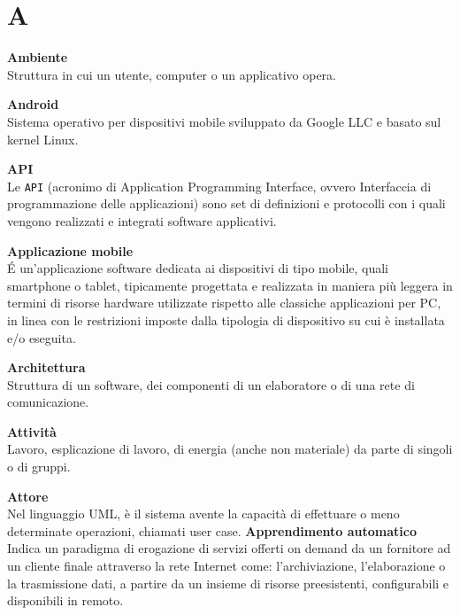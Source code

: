 \documentclass[a4paper, oneside, openany, dvipsnames, table, 12pt]{article}
\begin{document}
\copertina{}

\renewcommand{\arraystretch}{1.5}


\newpage
\tableofcontents
\newpage

\newpage
\section{A}  
\textbf{Ambiente} \\
Struttura in cui un utente, computer o un applicativo opera.

\textbf{Android} \\
Sistema operativo per dispositivi mobile sviluppato da Google LLC e basato sul kernel Linux.

\textbf{API} \\
Le \texttt{API} (acronimo di Application Programming Interface, ovvero Interfaccia di programmazione delle applicazioni) sono set di definizioni e protocolli con i quali vengono realizzati e integrati software applicativi. 

\textbf{Applicazione mobile} \\
\'E un'applicazione software dedicata ai dispositivi di tipo mobile, quali smartphone o tablet, tipicamente progettata e realizzata in maniera più leggera in termini di risorse hardware utilizzate rispetto alle classiche applicazioni per PC, in linea con le restrizioni imposte dalla tipologia di dispositivo su cui è installata e/o eseguita. 

\textbf{Architettura} \\
Struttura di un software, dei componenti di un elaboratore o di una rete di comunicazione.

\textbf{Attività} \\
Lavoro, esplicazione di lavoro, di energia (anche non materiale) da parte di singoli o di gruppi.

\textbf{Attore} \\
Nel linguaggio UML, è il sistema avente la capacità di effettuare o meno determinate operazioni, chiamati user case.
\label{par:appr_auto}
\textbf{Apprendimento automatico} \\ 
Indica un paradigma di erogazione di servizi offerti on demand da un fornitore ad un cliente finale attraverso la rete Internet come: l'archiviazione, l'elaborazione o la trasmissione dati, a partire da un insieme di risorse preesistenti, configurabili e disponibili in remoto.
\end{document}
